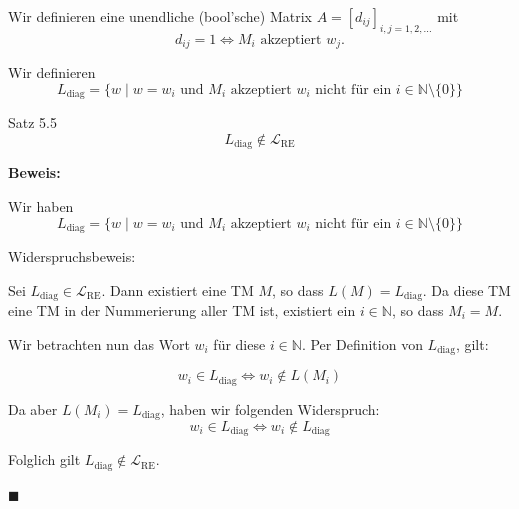 \documentclass[a4paper, 11pt]{article}
\def\N{\mathbb{N}}
\def\L{\mathcal{L}}
\begin{document}
            Wir definieren eine unendliche (bool'sche) Matrix $A = [d_{ij}]_{i,j = 1, 2, ...}$ mit 
            $$d_{ij} = 1 \iff M_i \text{ akzeptiert }w_j.$$
        
            Wir definieren
            $$L_{\text{diag}} = \{w \mid w = w_i \text{ und $M_i$ akzeptiert $w_i$ nicht für ein $i \in \N\setminus\{0\}$}\}$$
        
        
            \begin{mainbox}{Satz 5.5}
                $$L_{\text{diag}} \notin \L_{\text{RE}}$$
            \end{mainbox}
        
            \textbf{Beweis:}
        
            Wir haben 
            $$L_{\text{diag}} = \{w \mid w = w_i \text{ und $M_i$ akzeptiert $w_i$ nicht für ein $i \in \N\setminus\{0\}$}\}$$
        
            Widerspruchsbeweis:
        
            Sei $L_\text{diag} \in \L_{\text{RE}}$. Dann existiert eine TM $M$, so dass $L(M) = L_\text{diag}$. Da diese TM eine TM in der Nummerierung aller TM ist, existiert ein $i \in \N$, so dass $M_i = M$.
        
            Wir betrachten nun das Wort $w_i$ für diese $i \in \N$. Per Definition von $L_\text{diag}$, gilt:
        
            $$w_i \in L_\text{diag} \iff w_i \notin L(M_i)$$
        
            Da aber $L(M_i) = L_\text{diag}$, haben wir folgenden Widerspruch:
            $$w_i \in L_\text{diag} \iff w_i \notin L_\text{diag}$$
        
            Folglich gilt $L_\text{diag} \notin \L_\text{RE}$.
            
            \hspace*{0pt}\hfill$\blacksquare$
        
        
            
\end{document}
